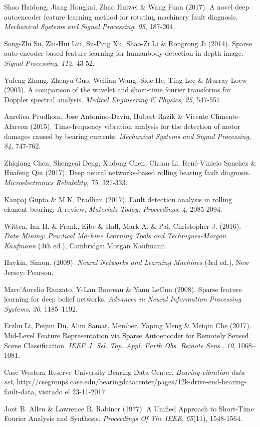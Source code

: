\documentclass[a4paper,12pt]{article}
\begin{document}
\begin{thebibliography}{9}
 Shao Haidong, Jiang Hongkai, Zhao Huiwei \& Wang Fuan (2017). A novel deep autoencoder feature learning method for rotating machinery fault diagnosis. \textit{Mechanical Systems and Signal Processing}, \textit{95}, 187-204. 

 Song-Zhi Su, Zhi-Hui Liu, Su-Ping Xu, Shao-Zi Li \& Rongrong Ji (2014). Sparse auto-encoder based feature learning for humanbody detection in depth image. \textit{Signal Processing}, \textit{112}, 43-52.

 Yufeng Zhang, Zhenyu Guo, Weilian Wang, Side He, Ting Lee \& Murray Loew (2003). A comparison of the wavelet and short-time fourier transforms for Doppler spectral analysis. \textit{Medical Engineering \& Physics}, \textit{25}, 547-557.

 Aurelien Prudhom, Jose Antonino-Daviu, Hubert Razik \& Vicente Climente-Alarcon (2015). Time-frequency vibration analysis for the detection of motor damages caused by bearing currents. \textit{Mechanical Systems and Signal Processing}, \textit{84}, 747-762.

 Zhiqiang Chen, Shengcai Deng, Xudong Chen, Chuan Li, René-Vinicio Sanchez \& Huafeng Qin (2017). Deep neural networks-based rolling bearing fault diagnosis. \textit{Microelectronics Reliability}, \textit{75}, 327-333.

 Kanpaj Gupta \& M.K. Pradhan (2017). Fault detection analysis in rolling element bearing: A review, \textit{Materials Today: Proceedings}, \textit{4}, 2085-2094.

 Witten, Ian H. \& Frank, Eibe \& Hall, Mark A. \& Pal, Christopher J. (2016). \textit{Data Mining: Practical Machine Learning Tools and Techniques-Morgan Kaufmann} (4th ed.), Cambridge: Morgan Kaufmann.

 Haykin, Simon. (2009). \textit{Neural Networks and Learning Machines} (3rd ed.), New Jersey: Pearson.

 Marc’Aurelio Ranzato, Y-Lan Boureau \& Yann LeCun (2008). Sparse feature learning for deep belief networks. \textit{Advances in Neural Information Processing Systems}, \textit{20}, 1185–1192.

 Erzhu Li, Peijun Du, Alim Samat, Member, Yaping Meng \& Meiqin Che (2017). Mid-Level Feature Representation via Sparse Autoencoder for Remotely Sensed Scene Classification. \textit{IEEE J. Sel. Top. Appl. Earth Obs. Remote Sens.}, \textit{10}, 1068–1081.

 Case Western Reserve University Bearing Data Center, \textit{Bearing vibration data set}, http://csegroups.case.edu/bearingdatacenter/pages/12k-drive-end-bearing-fault-data, visitado el 23-11-2017.

 Jont B. Allen \& Lawrence R. Rabiner (1977). A Unified Approach to Short-Time Fourier Analysis
and Synthesis. \textit{Proceedings Of The IEEE}, \textit{65}(11), 1548-1564.

\end{thebibliography}
\end{document}
